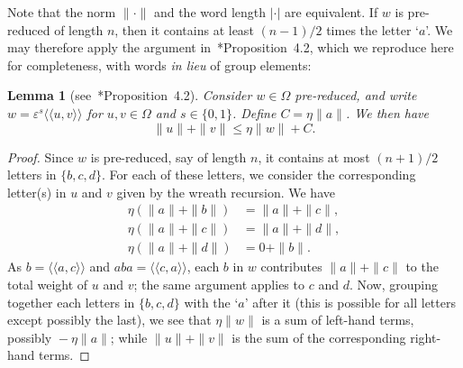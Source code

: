 \documentclass{amsart}
\def\pair<#1>{{\langle\!\langle}#1{\rangle\!\rangle}}
\newtheorem{lemma}{Lemma}[section]
\theoremstyle{definition}
\begin{document}
Note that the norm $\|\cdot\|$ and the word length $|\cdot|$ are
equivalent. If $w$ is pre-reduced of length $n$, then it contains at
least $(n-1)/2$ times the letter `$a$'. We may therefore apply the
argument in~\cite{bartholdi:upperbd}*{Proposition~4.2}, which we
reproduce here for completeness, with words \emph{in lieu} of group
elements:
\begin{lemma}[see~\cite{bartholdi:upperbd}*{Proposition~4.2}]\label{lem:contract}
  Consider $w\in \Omega$ pre-reduced, and write
  $w=\varepsilon^s\pair<u,v>$ for $u,v\in \Omega$ and
  $s\in\{0,1\}$. Define $C=\eta \|a\|$. We then have
  \[
   \|u\|+\|v\|  \le \eta\|w\|+C.
  \]
\end{lemma}
\begin{proof}
  Since $w$ is pre-reduced, say of length $n$, it contains at most
  $(n+1)/2$ letters in $\{b,c,d\}$. For each of these letters, we
  consider the corresponding letter(s) in $u$ and $v$ given by the
  wreath recursion. We have
  \begin{align*}
    \eta(\|a\|+\|b\|) &= \|a\|+\|c\|,\\
    \eta(\|a\|+\|c\|) &= \|a\|+\|d\|,\\
    \eta(\|a\|+\|d\|) &= 0+\|b\|.
  \end{align*}
  As $b=\pair<a,c>$ and $aba=\pair<c,a>$, each $b$ in $w$ contributes
  $\|a\|+\|c\|$ to the total weight of $u$ and $v$; the same argument
  applies to $c$ and $d$. Now, grouping together each letters in
  $\{b,c,d\}$ with the `$a$' after it (this is possible for all
  letters except possibly the last), we see that $\eta\|w\|$ is a sum
  of left-hand terms, possibly ${}-\eta\|a\|$; while $\|u\|+\|v\|$ is
  the sum of the corresponding right-hand terms.
\end{proof}
\end{document}
